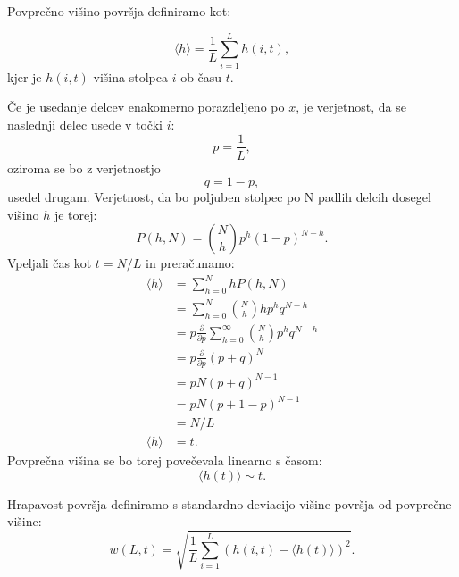 \documentclass[a4paper, twoside, 12pt]{book}
\begin{document}
Povprečno višino površja definiramo kot:

  \begin{equation}
    \langle h \rangle = \frac{1}{L} \sum_{i=1}^L h(i,t),
    \label{povprecna-visina}
  \end{equation}
kjer je $h(i,t)$ višina stolpca $i$ ob času $t$.

Če je usedanje delcev enakomerno porazdeljeno po $x$, je verjetnost, da se naslednji delec usede v točki $i$:
\begin{equation}
  p = \frac{1}{L},
\end{equation}
oziroma se bo z verjetnostjo
\begin{equation}
  q = 1 - p,
\end{equation}
usedel drugam.
Verjetnost, da bo poljuben stolpec po N padlih delcih dosegel višino $h$ je torej:
\begin{equation}
  P(h,N) = \binom{N}{h} p^h (1 - p)^{N - h}.
\end{equation}
Vpeljali čas kot $t = N / L$ in preračunamo:
\begin{align}
  \langle h \rangle &= \sum_{h=0}^{N} h P(h,N) \\
  &= \sum_{h=0}^{N} \binom{N}{h} h p^h q^{N - h} \\
  &= p \frac{\partial}{\partial p} \sum_{h=0}^{\infty} \binom{N}{h} p^h q^{N - h} \\
  &= p \frac{\partial}{\partial p} (p + q)^N \\
  &= p N (p + q)^{N-1} \\
  &= p N (p + 1 - p)^{N-1} \\
  &= N / L \\
  \langle h \rangle &= t.
\end{align}
Povprečna višina se bo torej povečevala linearno s časom:
\begin{equation}
  \langle h(t) \rangle \sim t.
\end{equation}

Hrapavost površja definiramo s standardno deviacijo višine površja od povprečne višine:
  \begin{equation}
    w(L,t) = \sqrt{\frac{1}{L} \sum_{i=1}^L (h(i,t)-\langle h(t) \rangle)^2}.
    \label{sirina-povrsine}
  \end{equation}
\end{document}
